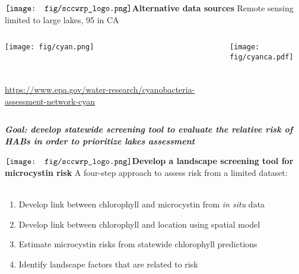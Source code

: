 \documentclass[serif]{beamer}\usepackage[]{graphicx}\usepackage[]{color}
\newcommand{\emtxt}[1]{\textbf{\textit{{\color{mypal4} #1}}}}
\begin{document}
\begin{frame}{{$\vcenter{\hbox{\texttt{[image: fig/sccwrp\_logo.png]}}}$\hspace{0.07in}\textbf{Alternative data sources}}}
Remote sensing limited to large lakes, 95 in CA
\begin{columns}
\begin{column}{0.5\textwidth}
\centering
\centerline{\texttt{[image: fig/cyan.png]}}\\~\\
{\tiny \url{https://www.epa.gov/water-research/cyanobacteria-assessment-network-cyan}}
\end{column}
\begin{column}{0.5\textwidth}
\centerline{\texttt{[image: fig/cyanca.pdf]}}
\end{column}
\end{columns}
\emtxt{Goal: develop statewide screening tool to evaluate the relative risk of HABs in order to prioritize lakes assessment}
\end{frame}

\begin{frame}{{$\vcenter{\hbox{\texttt{[image: fig/sccwrp\_logo.png]}}}$\hspace{0.07in}\textbf{Develop a landscape screening tool for microcystin risk}}}
A four-step approach to assess risk from a limited dataset:\\~\\
\begin{enumerate}
\item<+-> Develop link between chlorophyll and microcystin from \textit{in situ} data
\item<+-> Develop link between chlorophyll and location using spatial model
\item<+-> Estimate microcystin risks from statewide chlorophyll predictions
\item<+-> Identify landscape factors that are related to risk \\~\\
\end{enumerate}
\onslide<+->
\centering{\emtxt{Why chlorophyll?}}\\~\\
\end{frame}
\end{document}
